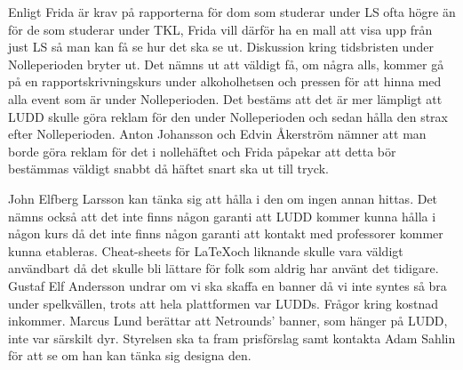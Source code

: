 \documentclass{protokoll}
\begin{document}
Enligt Frida är krav på rapporterna för dom som studerar under LS ofta högre än för de som studerar under TKL, Frida vill därför ha en mall att visa upp från just LS så man kan få se hur det ska se ut.  
Diskussion kring tidsbristen under Nolleperioden bryter ut. Det nämns ut att väldigt få, om några alls, kommer gå på en rapportskrivningskurs under alkoholhetsen och pressen för att hinna med alla event som är under Nolleperioden. Det bestäms att det är mer lämpligt att LUDD skulle göra reklam för den under Nolleperioden och sedan hålla den strax efter Nolleperioden. Anton Johansson och Edvin Åkerström nämner att man borde göra reklam för det i nollehäftet och Frida påpekar att detta bör bestämmas väldigt snabbt då häftet snart ska ut till tryck.  

John Elfberg Larsson kan tänka sig att hålla i den om ingen annan hittas. 
Det nämns också att det inte finns någon garanti att LUDD kommer kunna hålla i någon kurs då det inte finns någon garanti att kontakt med professorer kommer kunna etableras. 
Cheat-sheets för \LaTeX och liknande skulle vara väldigt användbart då det skulle bli lättare för folk som aldrig har använt det tidigare.  
Gustaf Elf Andersson undrar om vi ska skaffa en banner då vi inte syntes så bra under spelkvällen, trots att hela plattformen var LUDDs. Frågor kring kostnad inkommer. 
Marcus Lund berättar att Netrounds' banner, som hänger på LUDD, inte var särskilt dyr. 
Styrelsen ska ta fram prisförslag samt kontakta Adam Sahlin för att se om han kan tänka sig designa den.
\end{document}

